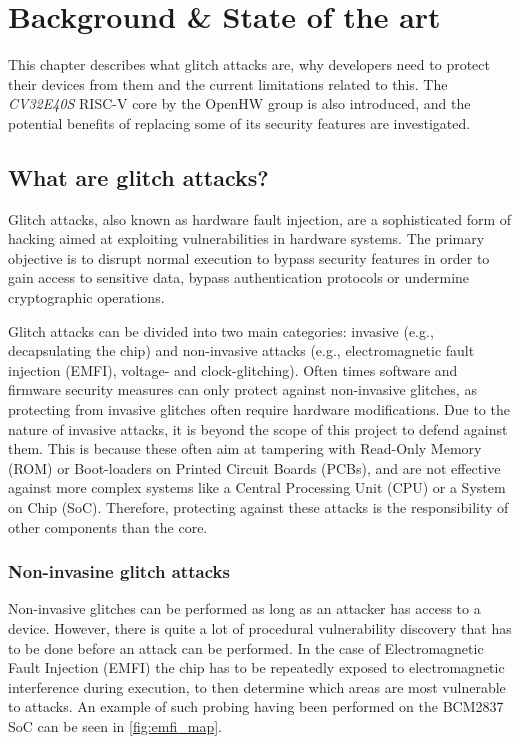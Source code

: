 \chapter{Background \& State of the art}
\label{chap3}

This chapter describes what glitch attacks are, why developers need to protect their devices from them and the current limitations related to this. The \textit{CV32E40S} RISC-V core by the OpenHW group is also introduced, and the potential benefits of replacing some of its security features are investigated. 

\section{What are glitch attacks?}
\label{sec:glitch_attacks}

Glitch attacks, also known as hardware fault injection, are a sophisticated form of hacking aimed at exploiting vulnerabilities in hardware systems. The primary objective is to disrupt normal execution to bypass security features in order to gain access to sensitive data, bypass authentication protocols or undermine cryptographic operations. 

Glitch attacks can be divided into two main categories: invasive (e.g., decapsulating the chip\cite{intro_to_hw_hacking}) and non-invasive attacks (e.g., electromagnetic fault injection (EMFI), voltage- and clock-glitching). Often times software and firmware security measures can only protect against non-invasive glitches, as protecting from invasive glitches often require hardware modifications\cite{glitchresistor}. Due to the nature of invasive attacks, it is beyond the scope of this project to defend against them. This is because these often aim at tampering with Read-Only Memory (ROM) or Boot-loaders on Printed Circuit Boards (PCBs), and are not effective against more complex systems like a Central Processing Unit (CPU) or a System on Chip (SoC). Therefore, protecting against these attacks is the responsibility of other components than the core.

\subsection{Non-invasine glitch attacks}
\label{sec:non_invasive}

Non-invasive glitches can be performed as long as an attacker has access to a device. However, there is quite a lot of procedural vulnerability discovery that has to be done before an attack can be performed\cite{arm_presentation_2}. In the case of Electromagnetic Fault Injection (EMFI) the chip has to be repeatedly exposed to electromagnetic interference during execution, to then determine which areas are most vulnerable to attacks\cite{emfi_injection}. An example of such probing having been performed on the BCM2837 SoC can be seen in \autoref{fig:emfi_map}\cite{emfi_injection}. 

